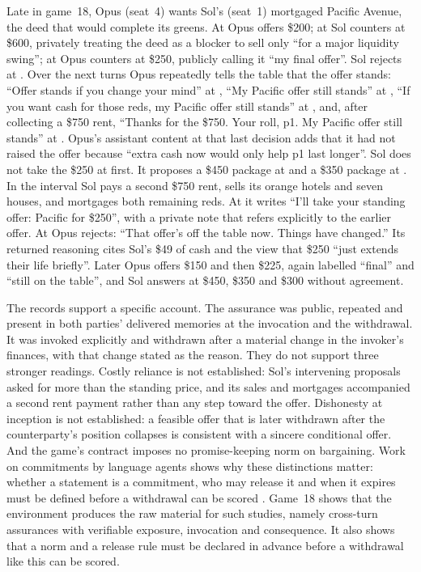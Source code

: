 Late in game~18, Opus (seat~4) wants Sol's (seat~1) mortgaged Pacific Avenue, the deed that would complete its greens. At  Opus offers \$200; at  Sol counters at \$600, privately treating the deed as a blocker to sell only ``for a major liquidity swing''; at  Opus counters at \$250, publicly calling it ``my final offer''. Sol rejects at . Over the next turns Opus repeatedly tells the table that the offer stands: ``Offer stands if you change your mind'' at , ``My Pacific offer still stands'' at , ``If you want cash for those reds, my Pacific offer still stands'' at , and, after collecting a \$750 rent, ``Thanks for the \$750. Your roll, p1. My Pacific offer still stands'' at . Opus's assistant content at that last decision adds that it had not raised the offer because ``extra cash now would only help p1 last longer''. Sol does not take the \$250 at first. It proposes a \$450 package at  and a \$350 package at . In the interval Sol pays a second \$750 rent, sells its orange hotels and seven houses, and mortgages both remaining reds. At  it writes ``I'll take your standing offer: Pacific for \$250'', with a private note that refers explicitly to the earlier offer. At  Opus rejects: ``That offer's off the table now. Things have changed.'' Its returned reasoning cites Sol's \$49 of cash and the view that \$250 ``just extends their life briefly''. Later Opus offers \$150 and then \$225, again labelled ``final'' and ``still on the table'', and Sol answers at \$450, \$350 and \$300 without agreement.

The records support a specific account. The assurance was public, repeated and present in both parties' delivered memories at the invocation and the withdrawal. It was invoked explicitly and withdrawn after a material change in the invoker's finances, with that change stated as the reason. They do not support three stronger readings. Costly reliance is not established: Sol's intervening proposals asked for more than the standing price, and its sales and mortgages accompanied a second rent payment rather than any step toward the offer. Dishonesty at inception is not established: a feasible offer that is later withdrawn after the counterparty's position collapses is consistent with a sincere conditional offer. And the game's contract imposes no promise-keeping norm on bargaining. Work on commitments by language agents shows why these distinctions matter: whether a statement is a commitment, who may release it and when it expires must be defined before a withdrawal can be scored \citep{empty_commitments_v2,commitment_standing,shi2026cheaptalk}. Game~18 shows that the environment produces the raw material for such studies, namely cross-turn assurances with verifiable exposure, invocation and consequence. It also shows that a norm and a release rule must be declared in advance before a withdrawal like this can be scored.

